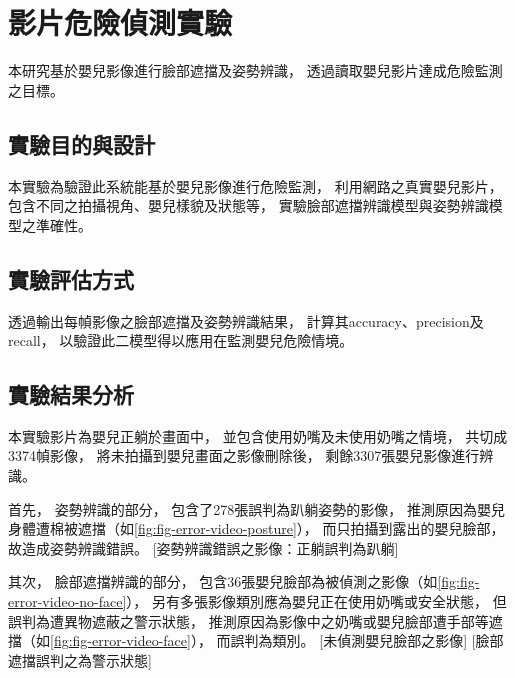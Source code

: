 \documentclass[class=NCU_thesis, crop=false]{standalone}
\begin{document}
\section{影片危險偵測實驗}
本研究基於嬰兒影像進行臉部遮擋及姿勢辨識，
透過讀取嬰兒影片達成危險監測之目標。

\subsection{實驗目的與設計}
本實驗為驗證此系統能基於嬰兒影像進行危險監測，
利用網路之真實嬰兒影片，
包含不同之拍攝視角、嬰兒樣貌及狀態等，
實驗臉部遮擋辨識模型與姿勢辨識模型之準確性。

\subsection{實驗評估方式}
透過輸出每幀影像之臉部遮擋及姿勢辨識結果，
計算其accuracy、precision及recall，
以驗證此二模型得以應用在監測嬰兒危險情境。

\subsection{實驗結果分析}
本實驗影片為嬰兒正躺於畫面中，
並包含使用奶嘴及未使用奶嘴之情境，
共切成3374幀影像，
將未拍攝到嬰兒畫面之影像刪除後，
剩餘3307張嬰兒影像進行辨識。

首先，
姿勢辨識的部分，
包含了278張誤判為趴躺姿勢的影像，
推測原因為嬰兒身體遭棉被遮擋（如\cref{fig:fig-error-video-posture}），
而只拍攝到露出的嬰兒臉部，
故造成姿勢辨識錯誤。
[姿勢辨識錯誤之影像：正躺誤判為趴躺]

其次，
臉部遮擋辨識的部分，
包含36張嬰兒臉部為被偵測之影像（如\cref{fig:fig-error-video-no-face}），
另有多張影像類別應為嬰兒正在使用奶嘴或安全狀態，
但誤判為遭異物遮蔽之警示狀態，
推測原因為影像中之奶嘴或嬰兒臉部遭手部等遮擋（如\cref{fig:fig-error-video-face}），
而誤判為類別。
[未偵測嬰兒臉部之影像]
[臉部遮擋誤判之為警示狀態]
\end{document}
